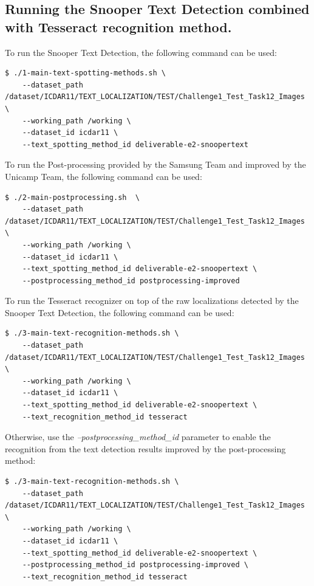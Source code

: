 \subsection{Running the Snooper Text Detection combined with Tesseract recognition method.}

To run the Snooper Text Detection, the following command can be used:
\begin{lstlisting}[style=fancyterminal]
 $ ./1-main-text-spotting-methods.sh \ 
    --dataset_path /dataset/ICDAR11/TEXT_LOCALIZATION/TEST/Challenge1_Test_Task12_Images \ 
    --working_path /working \ 
    --dataset_id icdar11 \ 
    --text_spotting_method_id deliverable-e2-snoopertext
\end{lstlisting}

To run the Post-processing provided by the Samsung Team and improved by the Unicamp Team, the following command can be used:

\begin{lstlisting}[style=fancyterminal]
 $ ./2-main-postprocessing.sh  \ 
    --dataset_path /dataset/ICDAR11/TEXT_LOCALIZATION/TEST/Challenge1_Test_Task12_Images \ 
    --working_path /working \ 
    --dataset_id icdar11 \ 
    --text_spotting_method_id deliverable-e2-snoopertext \ 
    --postprocessing_method_id postprocessing-improved
\end{lstlisting}

To run the Tesseract recognizer on top of the raw localizations detected by the Snooper Text Detection, the following command can be used:
\begin{lstlisting}[style=fancyterminal]
 $ ./3-main-text-recognition-methods.sh \ 
    --dataset_path /dataset/ICDAR11/TEXT_LOCALIZATION/TEST/Challenge1_Test_Task12_Images \ 
    --working_path /working \ 
    --dataset_id icdar11 \ 
    --text_spotting_method_id deliverable-e2-snoopertext \ 
    --text_recognition_method_id tesseract
\end{lstlisting}

Otherwise, use the \textit{--postprocessing\_method\_id} parameter to enable the recognition from the text detection results improved by the post-processing method:
\begin{lstlisting}[style=fancyterminal]
 $ ./3-main-text-recognition-methods.sh \ 
    --dataset_path /dataset/ICDAR11/TEXT_LOCALIZATION/TEST/Challenge1_Test_Task12_Images \ 
    --working_path /working \ 
    --dataset_id icdar11 \ 
    --text_spotting_method_id deliverable-e2-snoopertext \ 
    --postprocessing_method_id postprocessing-improved \ 
    --text_recognition_method_id tesseract
\end{lstlisting}


